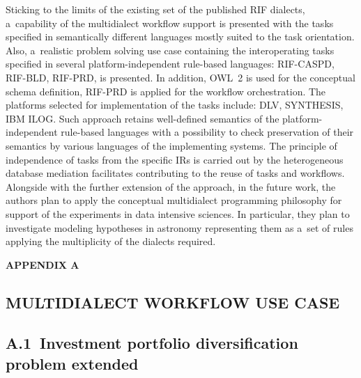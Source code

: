 \begin{multicols}{2}
  Sticking to the limits of the existing set of the published RIF dialects,
   a~capability of the multidialect workflow support
   is presented with the tasks specified in
semantically different languages mostly suited to the task orientation.
Also, a~realistic problem solving use case containing the interoperating tasks
specified in
several platform-independent rule-based languages: RIF-CASPD, RIF-BLD,
  RIF-PRD, is presented. In addition, OWL~2 is used for the conceptual schema definition,
  RIF-PRD is applied for the workflow orchestration. The platforms selected for
implementation of the tasks include: DLV, SYNTHESIS, IBM ILOG. Such approach
retains well-defined semantics of the platform-independent rule-based languages with
a possibility to check preservation of their semantics by various languages of the
implementing systems. The principle of independence of tasks from the specific IRs is
carried out by the heterogeneous database mediation facilitates contributing to the
  reuse of tasks and workflows. Alongside with the further extension of the
approach, in the future work, the authors plan to apply the conceptual multidialect
programming philosophy for support of the experiments in data intensive sciences. In
particular, they plan to investigate modeling hypotheses in astronomy representing them
as a~set of rules applying the multiplicity of the dialects required.



\vspace*{12pt}

{{\hfill \textbf{APPENDIX A}}}

\vspace*{-12pt}

\subsection*{MULTIDIALECT WORKFLOW USE CASE}


{\small





\subsection*{A.1\ Investment portfolio diversification\\
\hspace{20pt}problem extended}

}
\end{multicols}
